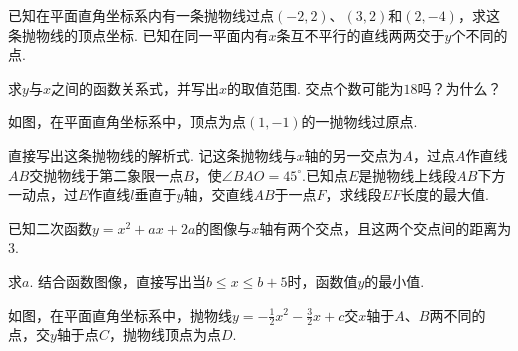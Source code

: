 \documentclass[10pt]{article}
\begin{document}
\begin{questions}{\answeringintroduction}
    \question 已知在平面直角坐标系内有一条抛物线过点$(-2,2)$、$(3,2)$和$(2,-4)$，求这条抛物线的顶点坐标.
    \addemptyline
    \question 已知在同一平面内有$x$条互不平行的直线两两交于$y$个不同的点.
    \begin{subquestions}
        \subquestion 求$y$与$x$之间的函数关系式，并写出$x$的取值范围.
        \subquestion 交点个数可能为$18$吗？为什么？
    \end{subquestions}
    \addemptyline\addemptyline\addemptyline\addemptyline\addemptyline
    \question 如图，在平面直角坐标系中，顶点为点$(1,-1)$的一抛物线过原点.
    \begin{subquestions}
        \subquestion 直接写出这条抛物线的解析式.
        \subquestion 记这条抛物线与$x$轴的另一交点为$A$，过点$A$作直线$AB$交抛物线于第二象限一点$B$，使$\angle BAO=45^{\circ}$.已知点$E$是抛物线上线段$AB$下方一动点，过$E$作直线$l$垂直于$y$轴，交直线$AB$于一点$F$，求线段$EF$长度的最大值.
    \end{subquestions}
    \begin{figure}[!htb]
        \raggedleft
    \end{figure}
    \question 已知二次函数$y=x^2+ax+2a$的图像与$x$轴有两个交点，且这两个交点间的距离为$3$.
    \begin{subquestions}
        \subquestion 求$a$.
        \subquestion 结合函数图像，直接写出当$b \le x \le b+5$时，函数值$y$的最小值.
    \end{subquestions}
    \addspace
    \question 如图，在平面直角坐标系中，抛物线$y = - \frac{1}{2}x^{2} - \frac{3}{2}x + c$交$x$轴于$A$、$B$两不同的点，交$y$轴于点$C$，抛物线顶点为点$D$.
    \begin{subquestions}

\end{subquestions}
\end{questions}
\end{document}
